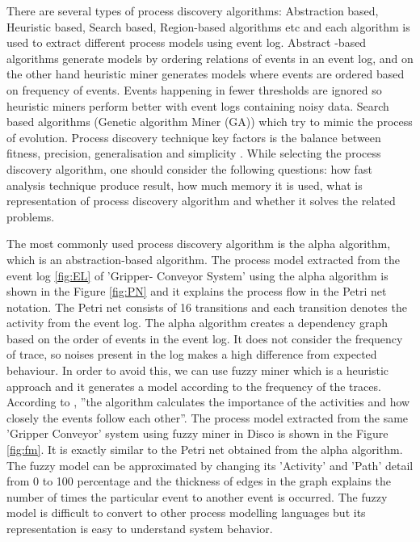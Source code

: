 \begin{bibunit}
   
	There are several types of process discovery algorithms: Abstraction based, Heuristic based, Search based, Region-based algorithms etc and each algorithm is used to extract different process models using event log. Abstract -based algorithms generate models by ordering relations of events in an event log, and on the other hand heuristic miner generates models where events are ordered based on frequency of events. Events happening in fewer thresholds are ignored so heuristic miners perform better with event logs containing noisy data. Search based algorithms (Genetic algorithm Miner (GA)) which try to mimic the process of evolution. Process discovery technique key factors is the balance between fitness, precision, generalisation and simplicity \cite{buijs2012role}. While selecting the process discovery algorithm, one should consider the following questions: how fast analysis technique produce result, how much memory it is used, what is representation of process discovery algorithm and whether it solves the related problems.
	
   
   The most commonly used process discovery algorithm is the alpha algorithm, which is an abstraction-based algorithm. The process model extracted from the event log \ref{fig:EL} of ’Gripper- Conveyor System’ using the alpha algorithm is shown in the Figure \ref{fig:PN} and it explains the process flow in the Petri net notation. The Petri net consists of 16 transitions and each transition denotes the activity from the event log. The alpha algorithm creates a dependency graph based on the order of events in the event log. It does not consider the frequency of trace, so noises present in the log makes a high difference from expected behaviour. In order to avoid this, we can use fuzzy miner which is a heuristic approach and it generates a model according to the frequency of the traces. According to  \cite{paper4}, ”the algorithm calculates the importance of the activities and how closely the events follow each other”. The process model extracted from the same ’Gripper Conveyor’ system using fuzzy miner in Disco is shown in the Figure \ref{fig:fm}. It is exactly similar to the Petri net obtained from the alpha algorithm. The fuzzy model can be approximated by changing its ’Activity’ and ’Path’ detail from 0 to 100 percentage and the thickness of edges in the graph explains the number of times the particular event to another event is occurred. The fuzzy model is difficult to convert to other process modelling languages but its representation is easy to understand system behavior.
   

\end{bibunit}
